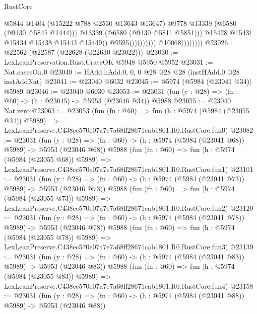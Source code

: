 \begin{lexlean}{RustCore}
\begin{coremodule}
                                                @5844
                                                @1404
                                                (@15222 @788 @2530 @13643 @13647)
                                                @9778
                                                @13339
                                                (@6580 (@9130 @5845 @1444)))
                                              @13339
                                              (@6580 (@9130 @5811 @5851)))
                                            @15428
                                            @15431
                                            @15434
                                            @15438
                                            @15443
                                            @15449))
                                        @9595))))))))))
                    @10068))))))))
@23026 := @22562 (@22587 (@22628 (@22630 @23022)))
@23030 := LexLeanPreservation.Rust.CrateOK @5948 @5950 @5952
@23031 := Nat.casesOn.{0}
@23040 := HAdd.hAdd.{0, 0, 0} @28 @28 @28 (instHAdd.{0} @28 instAddNat)
@23041 := @23040 @6032
@23045 := @5974 (@5984 (@23041 @34)) @5989
@23046 := @23040 @6030
@23053 := @23031 (fun (y : @28) => (fn : @60) -> (h : @23045) -> @5953 (@23046 @34)) @5988
@23055 := @23040 Nat.zero
@23063 := @23053
    (fun (fn : @60) =>
    fun (h : @5974 (@5984 (@23055 @34)) @5989) =>
    LexLeanPreserve.C438ec570e07a7e7a68ff28671cab1801.R0.RustCore.fun0)
@23082 := @23031
    (fun (y : @28) => (fn : @60) -> (h : @5974 (@5984 (@23041 @68)) @5989) -> @5953 (@23046 @68))
    @5988
    (fun (fn : @60) =>
    fun (h : @5974 (@5984 (@23055 @68)) @5989) =>
    LexLeanPreserve.C438ec570e07a7e7a68ff28671cab1801.R0.RustCore.fun1)
@23101 := @23031
    (fun (y : @28) => (fn : @60) -> (h : @5974 (@5984 (@23041 @73)) @5989) -> @5953 (@23046 @73))
    @5988
    (fun (fn : @60) =>
    fun (h : @5974 (@5984 (@23055 @73)) @5989) =>
    LexLeanPreserve.C438ec570e07a7e7a68ff28671cab1801.R0.RustCore.fun2)
@23120 := @23031
    (fun (y : @28) => (fn : @60) -> (h : @5974 (@5984 (@23041 @78)) @5989) -> @5953 (@23046 @78))
    @5988
    (fun (fn : @60) =>
    fun (h : @5974 (@5984 (@23055 @78)) @5989) =>
    LexLeanPreserve.C438ec570e07a7e7a68ff28671cab1801.R0.RustCore.fun3)
@23139 := @23031
    (fun (y : @28) => (fn : @60) -> (h : @5974 (@5984 (@23041 @83)) @5989) -> @5953 (@23046 @83))
    @5988
    (fun (fn : @60) =>
    fun (h : @5974 (@5984 (@23055 @83)) @5989) =>
    LexLeanPreserve.C438ec570e07a7e7a68ff28671cab1801.R0.RustCore.fun4)
@23158 := @23031
    (fun (y : @28) => (fn : @60) -> (h : @5974 (@5984 (@23041 @88)) @5989) -> @5953 (@23046 @88))

\end{coremodule}
\end{lexlean}

